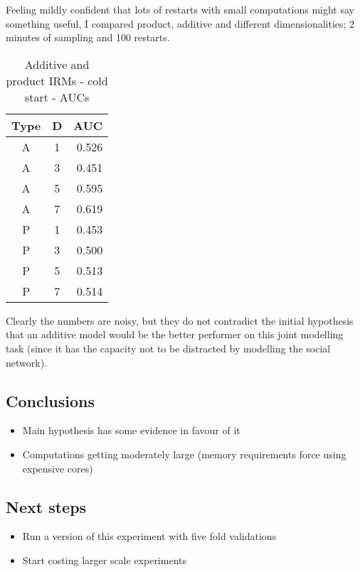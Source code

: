 \documentclass[twoside,11pt]{article}
\begin{document}
Feeling mildly confident that lots of restarts with small computations might say something useful, I compared product, additive and different dimensionalities; 2 minutes of sampling and 100 restarts.

\begin{table*}[ht!]
\caption{{\small
Additive and product IRMs - cold start - AUCs
}}
\label{tbl:IRM 01-Apr-2013}
\begin{center}
\begin{tabular}{c c | r}
Type & D & AUC\\
\hline
A & 1 & 0.526 \\
A & 3 & 0.451 \\
A & 5 & 0.595 \\
A & 7 & 0.619 \\
P & 1 & 0.453 \\
P & 3 & 0.500 \\
P & 5 & 0.513 \\
P & 7 & 0.514 
\end{tabular}
\end{center}
\end{table*}

Clearly the numbers are noisy, but they do not contradict the initial hypothesis that an additive model would be the better performer on this joint modelling task (since it has the capacity not to be distracted by modelling the social network).

\subsection{Conclusions}

\begin{itemize}
\item Main hypothesis has some evidence in favour of it
\item Computations getting moderately large (memory requirements force using expensive cores)
\end{itemize}

\subsection{Next steps}

\begin{itemize}
\item Run a version of this experiment with five fold validations
\item Start costing larger scale experiments
\end{itemize}
\end{document}
